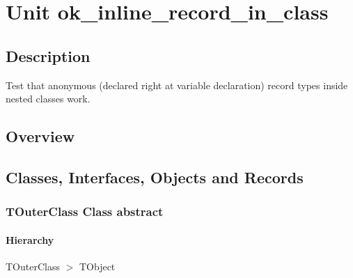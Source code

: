 \documentclass{report}
\begin{document}
\newlength{\tmplength}
\chapter{Unit ok{\_}inline{\_}record{\_}in{\_}class}
\section{Description}
Test that anonymous (declared right at variable declaration) record types inside nested classes work.
\section{Overview}
\begin{description}
\item[\texttt{\begin{ttfamily}TOuterClass\end{ttfamily} Class}]
\end{description}
\section{Classes, Interfaces, Objects and Records}
\subsection*{TOuterClass Class abstract}
\subsubsection*{\large{\textbf{Hierarchy}}\normalsize\hspace{1ex}\hfill}
TOuterClass {$>$} TObject
\end{document}
